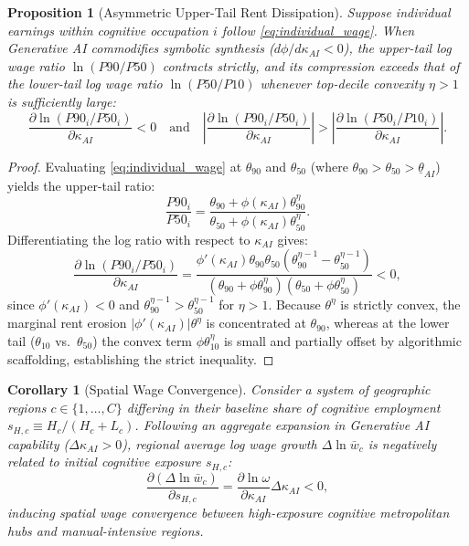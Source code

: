 \documentclass[12pt]{article}
\newtheorem{proposition}{Proposition}
\newtheorem{corollary}{Corollary}
\begin{document}
\begin{proposition}[Asymmetric Upper-Tail Rent Dissipation]
\label{prop:dispersion}
Suppose individual earnings within cognitive occupation $i$ follow \eqref{eq:individual_wage}. When Generative AI commodifies symbolic synthesis ($d\phi/d\kappa_{AI} < 0$), the upper-tail log wage ratio $\ln(P90/P50)$ contracts strictly, and its compression exceeds that of the lower-tail log wage ratio $\ln(P50/P10)$ whenever top-decile convexity $\eta > 1$ is sufficiently large:
\begin{equation}
\frac{\partial \ln (P90_i / P50_i)}{\partial \kappa_{AI}} < 0 \quad \text{and} \quad \left| \frac{\partial \ln (P90_i / P50_i)}{\partial \kappa_{AI}} \right| > \left| \frac{\partial \ln (P50_i / P10_i)}{\partial \kappa_{AI}} \right|.
\end{equation}
\end{proposition}
\begin{proof}
Evaluating \eqref{eq:individual_wage} at $\theta_{90}$ and $\theta_{50}$ (where $\theta_{90} > \theta_{50} > \underline{\theta}_{AI}$) yields the upper-tail ratio:
\begin{equation}
\frac{P90_i}{P50_i} = \frac{\theta_{90} + \phi(\kappa_{AI}) \theta_{90}^\eta}{\theta_{50} + \phi(\kappa_{AI}) \theta_{50}^\eta}.
\end{equation}
Differentiating the log ratio with respect to $\kappa_{AI}$ gives:
\begin{equation}
\frac{\partial \ln (P90_i / P50_i)}{\partial \kappa_{AI}} = \frac{\phi'(\kappa_{AI}) \theta_{90} \theta_{50} (\theta_{90}^{\eta - 1} - \theta_{50}^{\eta - 1})}{(\theta_{90} + \phi \theta_{90}^\eta)(\theta_{50} + \phi \theta_{50}^\eta)} < 0,
\end{equation}
since $\phi'(\kappa_{AI}) < 0$ and $\theta_{90}^{\eta - 1} > \theta_{50}^{\eta - 1}$ for $\eta > 1$. Because $\theta^\eta$ is strictly convex, the marginal rent erosion $|\phi'(\kappa_{AI})| \theta^\eta$ is concentrated at $\theta_{90}$, whereas at the lower tail ($\theta_{10}$ vs.\ $\theta_{50}$) the convex term $\phi \theta_{10}^\eta$ is small and partially offset by algorithmic scaffolding, establishing the strict inequality.
\end{proof}

\begin{corollary}[Spatial Wage Convergence]
\label{cor:spatial}
Consider a system of geographic regions $c \in \{1, \dots, C\}$ differing in their baseline share of cognitive employment $s_{H,c} \equiv H_c / (H_c + L_c)$. Following an aggregate expansion in Generative AI capability ($\Delta \kappa_{AI} > 0$), regional average log wage growth $\Delta \ln \bar{w}_c$ is negatively related to initial cognitive exposure $s_{H,c}$:
\begin{equation}
\frac{\partial (\Delta \ln \bar{w}_c)}{\partial s_{H,c}} = \frac{\partial \ln \omega}{\partial \kappa_{AI}} \Delta \kappa_{AI} < 0,
\end{equation}
inducing spatial wage convergence between high-exposure cognitive metropolitan hubs and manual-intensive regions.
\end{corollary}
\end{document}
